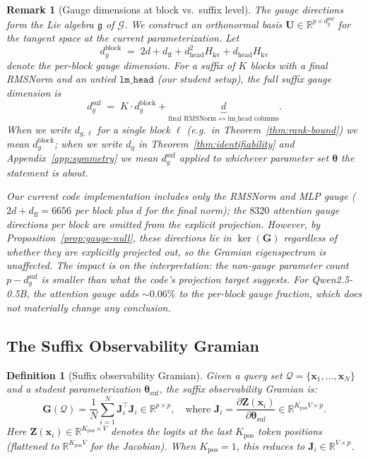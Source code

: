 \documentclass{article}
\newtheorem{definition}[theorem]{Definition}
\newtheorem{remark}[theorem]{Remark}
\newcommand{\R}{\mathbb{R}}
\newcommand{\cQ}{\mathcal{Q}}
\newcommand{\cG}{\mathcal{G}}
\newcommand{\btheta}{\boldsymbol{\theta}}
\newcommand{\bx}{\mathbf{x}}
\newcommand{\bJ}{\mathbf{J}}
\newcommand{\bG}{\mathbf{G}}
\newcommand{\bU}{\mathbf{U}}
\newcommand{\bZ}{\mathbf{Z}}
\begin{document}
\begin{remark}[Gauge dimensions at block vs.\ suffix level]
\label{rem:gauge-dims}
The gauge directions form the Lie algebra $\mathfrak{g}$ of $\cG$. We construct an orthonormal basis $\bU \in \R^{p \times d_g^{\text{suf}}}$ for the tangent space at the current parameterization. Let
\[
d_g^{\text{block}} \;=\; 2d + d_\text{ff} + d_\text{head}^2 H_{\text{kv}} + d_\text{head} H_{\text{kv}}
\]
denote the per-block gauge dimension. For a suffix of $K$ blocks with a final RMSNorm and an \emph{untied} $\texttt{lm\_head}$ (our student setup), the full suffix gauge dimension is
\[
d_g^{\text{suf}} \;=\; K \cdot d_g^{\text{block}} + \underbrace{d}_{\text{final RMSNorm $\leftrightarrow$ lm\_head columns}}.
\]
When we write $d_{g,\ell}$ for a single block $\ell$ (e.g.\ in Theorem~\ref{thm:rank-bound}) we mean $d_g^{\text{block}}$; when we write $d_g$ in Theorem~\ref{thm:identifiability} and Appendix~\ref{app:symmetry} we mean $d_g^{\text{suf}}$ applied to whichever parameter set $\btheta$ the statement is about.

Our current code implementation includes only the RMSNorm and MLP gauge ($2d + d_\text{ff} = 6656$ per block plus $d$ for the final norm); the $8320$ attention gauge directions per block are omitted from the explicit projection. However, by Proposition~\ref{prop:gauge-null}, these directions lie in $\ker(\bG)$ regardless of whether they are explicitly projected out, so the Gramian eigenspectrum is unaffected. The impact is on the \emph{interpretation}: the non-gauge parameter count $p - d_g^{\text{suf}}$ is smaller than what the code's projection target suggests. For Qwen2.5-0.5B, the attention gauge adds $\sim 0.06\%$ to the per-block gauge fraction, which does not materially change any conclusion.
\end{remark}

\subsection{The Suffix Observability Gramian}
\label{sec:gramian-theory}

\begin{definition}[Suffix observability Gramian]
\label{def:gramian}
Given a query set $\cQ = \{\bx_1, \ldots, \bx_N\}$ and a student parameterization $\btheta_{\text{suf}}$, the suffix observability Gramian is:
\begin{equation}\label{eq:gramian}
 \bG(\cQ) = \frac{1}{N}\sum_{i=1}^{N} \bJ_i^\top \bJ_i \in \R^{p \times p},
 \quad \text{where } \bJ_i = \frac{\partial \bZ(\bx_i)}{\partial \btheta_{\text{suf}}} \in \R^{K_{\text{pos}} V \times p}.
\end{equation}
Here $\bZ(\bx_i) \in \R^{K_{\text{pos}} \times V}$ denotes the logits at the last $K_{\text{pos}}$ token positions (flattened to $\R^{K_{\text{pos}} V}$ for the Jacobian). When $K_{\text{pos}} = 1$, this reduces to $\bJ_i \in \R^{V \times p}$.
\end{definition}
\end{document}

